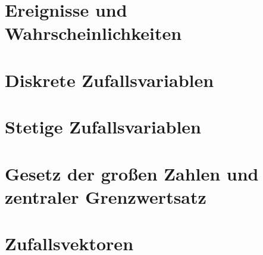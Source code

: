 \section{Ereignisse und Wahrscheinlichkeiten}
\section{Diskrete Zufallsvariablen}
\section{Stetige Zufallsvariablen}
\section{Gesetz der großen Zahlen und zentraler Grenzwertsatz}
\section{Zufallsvektoren}
